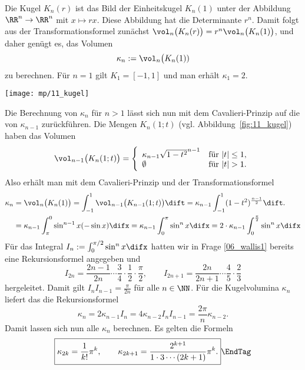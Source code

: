 \begin{antwort}
  Die Kugel $K_n(r)$ ist das Bild der Einheitskugel $K_n(1)$ unter 
  der Abbildung $\RR^n \to \RR^n $ mit $x \mapsto rx$. Diese 
  Abbildung hat die Determinante $r^n$. 
  Damit folgt aus der Transformationsformel zunächst 
  $\vol_n\big( K_n(r)\big) = r^n \vol_n\big( K_n(1)\big)$, und daher genügt es, 
  das Volumen 
  \[
  \kappa_n := \vol_n \big( K_n(1) )
  \]
  zu berechnen. F\"ur $n=1$ gilt $K_1 = [-1,1]$ und man erh\"alt $\kappa_1=2$. 

  \begin{center}
    \texttt{[image: mp/11\_kugel]}
    \label{fig:11_kugel}
  \end{center}

  Die Berechnung von $\kappa_n$ f\"ur $n>1$ l\"asst sich nun  
  mit dem Cavalieri-Prinzip auf die von $\kappa_{n-1}$ 
  zur\"uckf\"uhren.  
  Die Mengen $K_n(1;t)$ (vgl. Abbildung~\ref{fig:11_kugel}) haben das Volumen 
  \[
  \vol_{n-1}\big( K_n(1;t) \big) = \left\{ \begin{array}{ll}
      \kappa_{n-1} \sqrt{1-t^2}^{n-1} & \text{f\"ur $|t|\le 1$,}  \\
      \emptyset   & \text{f\"ur $|t|>1$.}
    \end{array}\right.
  \]
  Also erh\"alt man mit dem Cavalieri-Prinzip und der Transformationsformel 
  \begin{align*}
    \kappa_n &= \vol_n\big( K_n(1) \big) = 
    \int_{-1}^1 \vol_{n-1}\big( K_{n-1} (1;t) \big) \dift = 
    \kappa_{n-1} \int_{-1}^1 (1-t^2)^{\frac{n-1}{2}} \dift. \\
    &= \kappa_{n-1} \int_\pi^0 \sin^{n-1} x (-\sin x) \difx = 
    \kappa_{n-1} \int_0^\pi \sin^n x \difx = 
    2\cdot \kappa_{n-1} \int_0^{\frac{\pi}{2}} \sin^n x \difx 
  \end{align*}
  F\"ur das Integral $I_n := \int_0^{\pi/2} \sin^n x \difx$
  hatten wir in Frage \ref{06_wallis1} bereits eine Rekursionsformel 
  angegeben und 
  \[
  I_{2n} = \frac{2n-1}{2n}\cdots\frac{3}{4}\cdot\frac{1}{2}\cdot\frac{\pi}{2}, 
  \qquad 
  I_{2n+1} = \frac{2n}{2n+1}\cdots\frac{4}{5}\cdot\frac{2}{3}
  \]
  hergeleitet. Damit gilt 
  $I_n I_{n-1} = \frac{\pi}{2n}$  f\"ur alle $n\in \NN$. 
  F\"ur die Kugelvolumina $\kappa_n$ liefert das die Rekursionsformel
  \[
  \kappa_n = 2 \kappa_{n-1} I_n = 4 \kappa_{n-2} I_n I_{n-1} = 
  \frac{2\pi}{n}\kappa_{n-2}.
  \]
  Damit lassen sich nun alle $\kappa_n$ berechnen. 
  Es gelten die Formeln 
  \[
  \boxed{
    \kappa_{2k} = \frac{1}{k!}\pi^k, \qquad
    \kappa_{2k+1} = \frac{2^{k+1}}{1\cdot 3\cdots (2k+1)}\pi^k.
  }
  \EndTag
  \] 
\end{antwort}

